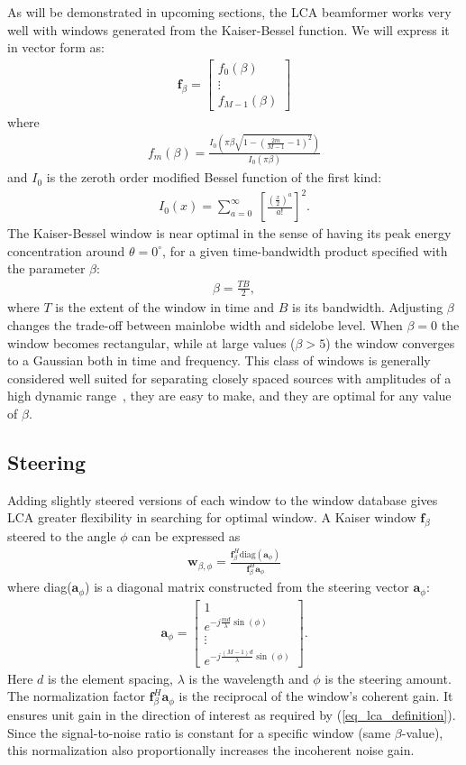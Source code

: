 \documentclass[10pt,journal,draftclsnofoot,onecolumn]{IEEEtran}
\newcommand\bmat[1]{\begin{bmatrix}#1\end{bmatrix}}
\newcommand\diag{\text{diag}}
\newcommand\sumb[2]{\sum\limits_{#1}^{#2}\;}
\renewcommand\H{^{\scriptscriptstyle H}}
\renewcommand\vec[1]{\boldsymbol{#1}}
\newcommand\1{\vec 1}
\renewcommand*\a{\vec a}
\newcommand*\f{\vec f}
\newcommand*\w{\vec w}
\begin{document}
As will be demonstrated in upcoming sections, the LCA beamformer works very well with windows generated from the Kaiser-Bessel function. We will express it in vector form as:
%
\begin{align*}
\f_\beta = \bmat{
f_0(\beta) \\
\vdots\\
f_{M-1}(\beta)
}
\end{align*}
%
where
%
\begin{align}
f_m(\beta) = \frac{I_0\left(\pi\beta\sqrt{1-\left(\frac{2m}{M-1}-1\right)^2}\right)}{I_0(\pi\beta)}
\end{align}
%
and $I_0$ is the zeroth order modified Bessel function of the first kind:
%
\begin{align}
I_0(x) = \sumb{a=0}{\infty} \left[ \frac{\left(\frac{x}{2}\right)^a}{a!} \right]^2.
\end{align}
%
The Kaiser-Bessel window is near optimal in the sense of having its peak energy concentration around $\theta=0^\circ$, for a given time-bandwidth product specified with the parameter $\beta$:
%
\begin{align}
\beta = \frac{TB}{2},
\end{align}
%
where $T$ is the extent of the window in time and $B$ is its bandwidth. Adjusting $\beta$ changes the trade-off between mainlobe width and sidelobe level. When $\beta=0$ the window becomes rectangular, while at large values ($\beta>5$) the window converges to a Gaussian both in time and frequency. This class of windows is generally considered well suited for separating closely spaced sources with amplitudes of a high dynamic range~\cite{Harris1978}, they are easy to make, and they are optimal for any value of $\beta$. 


\subsection{Steering}

Adding slightly steered versions of each window to the window database gives LCA greater flexibility in searching for optimal window. A Kaiser window $\f_\beta$ steered to the angle $\phi$ can be expressed as 
%
\begin{align}
\w_{\beta,\phi} = \frac{\f_\beta\H\diag{(\a_\phi)}}{\f_\beta\H\a_\phi}
\end{align}
%
where diag($\a_\phi$) is a diagonal matrix constructed from the steering vector $\a_\phi$:
%
\begin{align}
\a_\phi = \bmat{
1 \\
e^{-j\frac{md}{\lambda}\sin(\phi)} \\
\vdots\\
e^{-j\frac{(M-1)d}{\lambda}\sin(\phi)}
}.
\end{align}
%
Here $d$ is the element spacing, $\lambda$ is the wavelength and $\phi$ is the steering amount. The normalization factor $\f_\beta\H\a_\phi$ is the reciprocal of the window's coherent gain. It ensures unit gain in the direction of interest as required by (\ref{eq_lca_definition}). Since the signal-to-noise ratio is constant for a specific window (same $\beta$-value), this normalization also proportionally increases the incoherent noise gain.
\end{document}
